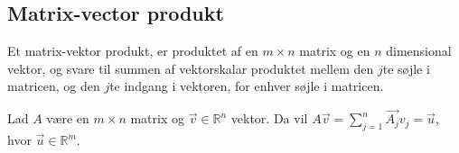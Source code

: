 \subsection{Matrix-vector produkt}
Et matrix-vektor produkt, er produktet af en $m\times n$ matrix og en $n$ dimensional vektor, og svare til summen af vektorskalar produktet mellem den $j$te søjle i matricen, og den $j$te indgang i vektoren, for enhver søjle i matricen.
\begin{defn}
Lad $A$ være en $m\times n$ matrix og $\vec{v}\in \mathds{R}^n$ vektor. 
Da vil $A \vec{v} = \sum_{j=1}^n \vec{A_j}v_j = \vec{u}$, hvor $\vec{u} \in \mathds{R}^m$.
\label{def:matrixvektorprodukt}
\end{defn}
